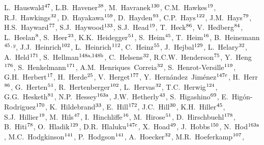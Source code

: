 \begin{flushleft}
L.~Hauswald$^\textrm{\scriptsize 47}$,
L.B.~Havener$^\textrm{\scriptsize 38}$,
M.~Havranek$^\textrm{\scriptsize 130}$,
C.M.~Hawkes$^\textrm{\scriptsize 19}$,
R.J.~Hawkings$^\textrm{\scriptsize 32}$,
D.~Hayakawa$^\textrm{\scriptsize 159}$,
D.~Hayden$^\textrm{\scriptsize 93}$,
C.P.~Hays$^\textrm{\scriptsize 122}$,
J.M.~Hays$^\textrm{\scriptsize 79}$,
H.S.~Hayward$^\textrm{\scriptsize 77}$,
S.J.~Haywood$^\textrm{\scriptsize 133}$,
S.J.~Head$^\textrm{\scriptsize 19}$,
T.~Heck$^\textrm{\scriptsize 86}$,
V.~Hedberg$^\textrm{\scriptsize 84}$,
L.~Heelan$^\textrm{\scriptsize 8}$,
S.~Heer$^\textrm{\scriptsize 23}$,
K.K.~Heidegger$^\textrm{\scriptsize 51}$,
S.~Heim$^\textrm{\scriptsize 45}$,
T.~Heim$^\textrm{\scriptsize 16}$,
B.~Heinemann$^\textrm{\scriptsize 45}$$^{,y}$,
J.J.~Heinrich$^\textrm{\scriptsize 102}$,
L.~Heinrich$^\textrm{\scriptsize 112}$,
C.~Heinz$^\textrm{\scriptsize 55}$,
J.~Hejbal$^\textrm{\scriptsize 129}$,
L.~Helary$^\textrm{\scriptsize 32}$,
A.~Held$^\textrm{\scriptsize 171}$,
S.~Hellman$^\textrm{\scriptsize 148a,148b}$,
C.~Helsens$^\textrm{\scriptsize 32}$,
R.C.W.~Henderson$^\textrm{\scriptsize 75}$,
Y.~Heng$^\textrm{\scriptsize 176}$,
S.~Henkelmann$^\textrm{\scriptsize 171}$,
A.M.~Henriques~Correia$^\textrm{\scriptsize 32}$,
S.~Henrot-Versille$^\textrm{\scriptsize 119}$,
G.H.~Herbert$^\textrm{\scriptsize 17}$,
H.~Herde$^\textrm{\scriptsize 25}$,
V.~Herget$^\textrm{\scriptsize 177}$,
Y.~Hern\'andez~Jim\'enez$^\textrm{\scriptsize 147c}$,
H.~Herr$^\textrm{\scriptsize 86}$,
G.~Herten$^\textrm{\scriptsize 51}$,
R.~Hertenberger$^\textrm{\scriptsize 102}$,
L.~Hervas$^\textrm{\scriptsize 32}$,
T.C.~Herwig$^\textrm{\scriptsize 124}$,
G.G.~Hesketh$^\textrm{\scriptsize 81}$,
N.P.~Hessey$^\textrm{\scriptsize 163a}$,
J.W.~Hetherly$^\textrm{\scriptsize 43}$,
S.~Higashino$^\textrm{\scriptsize 69}$,
E.~Hig\'on-Rodriguez$^\textrm{\scriptsize 170}$,
K.~Hildebrand$^\textrm{\scriptsize 33}$,
E.~Hill$^\textrm{\scriptsize 172}$,
J.C.~Hill$^\textrm{\scriptsize 30}$,
K.H.~Hiller$^\textrm{\scriptsize 45}$,
S.J.~Hillier$^\textrm{\scriptsize 19}$,
M.~Hils$^\textrm{\scriptsize 47}$,
I.~Hinchliffe$^\textrm{\scriptsize 16}$,
M.~Hirose$^\textrm{\scriptsize 51}$,
D.~Hirschbuehl$^\textrm{\scriptsize 178}$,
B.~Hiti$^\textrm{\scriptsize 78}$,
O.~Hladik$^\textrm{\scriptsize 129}$,
D.R.~Hlaluku$^\textrm{\scriptsize 147c}$,
X.~Hoad$^\textrm{\scriptsize 49}$,
J.~Hobbs$^\textrm{\scriptsize 150}$,
N.~Hod$^\textrm{\scriptsize 163a}$,
M.C.~Hodgkinson$^\textrm{\scriptsize 141}$,
P.~Hodgson$^\textrm{\scriptsize 141}$,
A.~Hoecker$^\textrm{\scriptsize 32}$,
M.R.~Hoeferkamp$^\textrm{\scriptsize 107}$,
$$
\end{flushleft}
